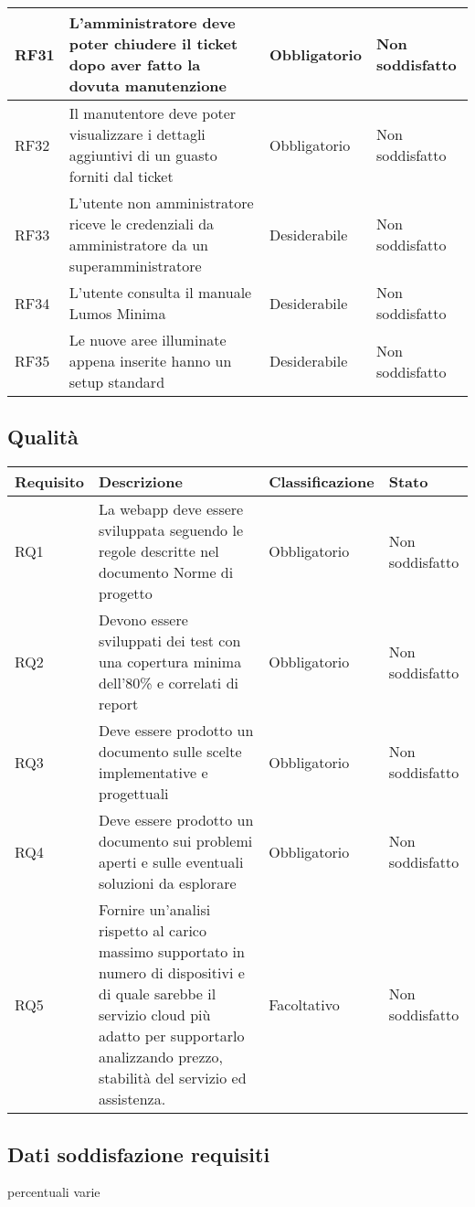 \documentclass[12pt]{article}
\begin{document}
\begin{xltabular}{\linewidth}{|>{\hsize}X|>{\hsize}X|>{\hsize}X|>{\hsize}X|}
	\hline				
	RF31	 & L'amministratore deve poter chiudere il ticket dopo aver fatto la dovuta manutenzione & Obbligatorio	 & Non soddisfatto \\
	\hline				
	RF32	 & Il manutentore deve poter visualizzare i dettagli aggiuntivi di un guasto forniti dal ticket	 & Obbligatorio	 & Non soddisfatto \\
	\hline				
	RF33	 & L'utente non amministratore riceve le credenziali da amministratore da un superamministratore & Desiderabile	 & Non soddisfatto \\
	\hline				
	RF34	 & L'utente consulta il manuale Lumos Minima	 & Desiderabile	 & Non soddisfatto \\
	\hline				
	RF35	 & Le nuove aree illuminate appena inserite hanno un setup standard	 & Desiderabile	 & Non soddisfatto \\
	\hline				
	\end{xltabular}
	
	
	\subsection{Qualità}
	\begin{tabular}{ |p{1.8cm}|p{5.2cm}|p{3cm}| p{2cm}| }
	\hline
	Requisito& Descrizione &Classificazione & Stato \\
	\hline
	RQ1 & La webapp deve essere sviluppata seguendo le regole descritte nel documento Norme di progetto & Obbligatorio & Non soddisfatto \\
	RQ2 & Devono essere sviluppati dei test con una copertura minima dell'80\% e correlati di report & Obbligatorio & Non soddisfatto\\
	RQ3 & Deve essere prodotto un documento sulle scelte implementative e progettuali & Obbligatorio & Non soddisfatto \\
	RQ4 & Deve essere prodotto un documento sui problemi aperti e sulle eventuali soluzioni da esplorare & Obbligatorio & Non soddisfatto \\
	RQ5 & Fornire un’analisi rispetto al carico massimo supportato in numero di dispositivi e di quale sarebbe il servizio cloud più adatto per supportarlo analizzando prezzo, stabilità del servizio ed assistenza.  &  Facoltativo & Non soddisfatto \\
	\hline
	
	\end{tabular}
\subsection{Dati soddisfazione requisiti}
percentuali varie
\end{document}
